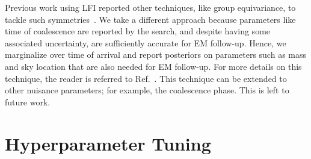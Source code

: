 \begin{refsection}
Previous work using LFI reported other techniques, like group equivariance, to tackle such symmetries~\cite{dax2023group}.
We take a different approach because parameters like time of coalescence are reported by the search, and despite having some associated uncertainty, are sufficiently accurate for EM follow-up. 
Hence, we marginalize over time of arrival and report posteriors on parameters such as mass and sky location that are also needed for EM follow-up. 
For more details on this technique, the reader is referred to Ref.~\cite{chatterjee2023optimizing}. 
This technique can be extended to other nuisance parameters; for example, the coalescence phase. 
This is left to future work.

\section{Hyperparameter Tuning}
\label{amp_meth_sec:hpo}


\end{refsection}
